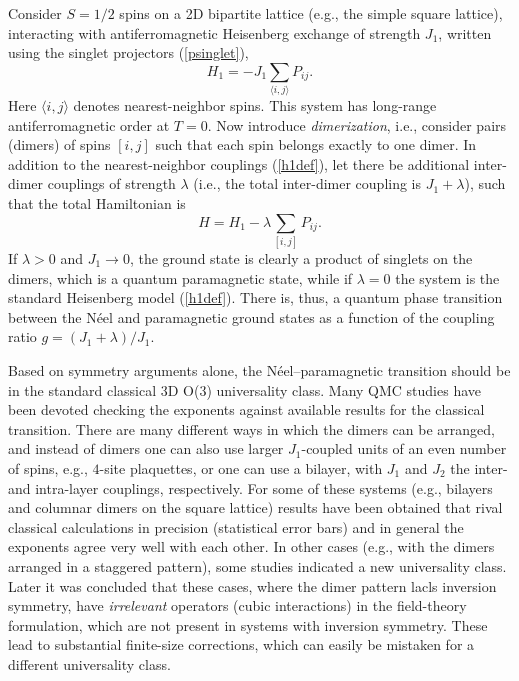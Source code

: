 \documentclass[range]{ar2e}
\begin{document}
Consider $S=1/2$ spins on a 2D bipartite lattice (e.g., the simple square lattice), interacting with antiferromagnetic Heisenberg exchange of 
strength $J_1$, written using the singlet projectors (\ref{psinglet}),
\begin{equation}
H_1 = -J_1 \sum_{\langle i,j\rangle} P_{ij}.
\label{h1def}
\end{equation}
Here $\langle i,j\rangle$ denotes nearest-neighbor spins. This system has long-range antiferromagnetic order at $T=0$. Now introduce {\it dimerization}, 
i.e., consider pairs (dimers) of spins $[i,j]$ such that each spin belongs exactly to one dimer. In addition to the nearest-neighbor couplings (\ref{h1def}),
let there be additional inter-dimer couplings of strength $\lambda$ (i.e., the total inter-dimer coupling is $J_1+\lambda$), such that the total Hamiltonian is
\begin{equation}
H = H_1  -\lambda \sum_{[ i,j]} P_{ij} .
\end{equation}
If $\lambda>0$ and $J_1\to 0$, the ground state is clearly a product of singlets on the dimers, which is a quantum paramagnetic state, while if $\lambda=0$ 
the system is the standard Heisenberg model (\ref{h1def}). There is, thus, a quantum phase transition between the N\'eel and paramagnetic ground states as a 
function of the coupling ratio $g=(J_1+\lambda)/J_1$. 

Based on symmetry arguments alone, the N\'eel--paramagnetic transition should be in the standard classical 3D O($3$) universality class. Many QMC studies 
have been devoted checking the exponents against available results for the classical transition. There are many different ways in which the dimers can be 
arranged, and instead of dimers one can also use larger $J_1$-coupled units of an even number of spins, e.g., $4$-site plaquettes, or one can use a
bilayer, with $J_1$ and $J_2$ the inter-and intra-layer couplings, respectively. For some of these systems (e.g., bilayers and columnar dimers on the
square lattice) results have been obtained that rival classical calculations in precision (statistical error bars) and in general the exponents agree 
very well with each other. In other cases (e.g., with the dimers arranged in a staggered pattern), some studies indicated a new universality class.
Later it was concluded that these cases, where the dimer pattern lacls inversion symmetry, have {\it irrelevant} operators (cubic interactions) in 
the field-theory formulation, which are not present in systems with inversion symmetry. These lead to substantial finite-size corrections, which can
easily be mistaken for a different universality class.
\end{document}
